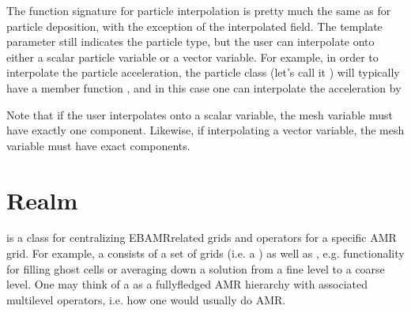 \documentclass[letterpaper,10pt,english]{sphinxmanual}
\begin{document}
The function signature for particle interpolation is pretty much the same as for particle deposition, with the exception of the interpolated field.
The template parameter  still indicates the particle type, but the user can interpolate onto either a scalar particle variable or a vector variable.
For example, in order to interpolate the particle acceleration, the particle class (let’s call it ) will typically have a member function , and in this case one can interpolate the acceleration by

\begin{sphinxVerbatim}[commandchars=\\\{\},formatcom=\scriptsize]
 

 
\end{sphinxVerbatim}

Note that if the user interpolates onto a scalar variable, the mesh variable must have exactly one component.
Likewise, if interpolating a vector variable, the mesh variable must have exact  components.


\section{Realm}
\label{\detokenize{Source/Realm:realm}}\label{\detokenize{Source/Realm:chap-realm}}\label{\detokenize{Source/Realm::doc}}
 is a class for centralizing EBAMR\sphinxhyphen{}related grids and operators for a specific AMR grid.
For example, a  consists of a set of grids (i.e. a ) as well as , e.g. functionality for filling ghost cells or averaging down a solution from a fine level to a coarse level.
One may think of a  as a fully\sphinxhyphen{}fledged AMR hierarchy with associated multilevel operators, i.e. how one would usually do AMR.
\end{document}
